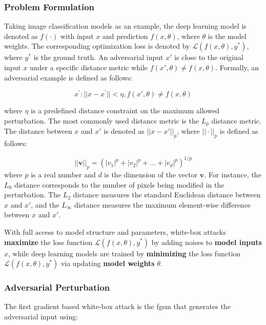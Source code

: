 \subsubsection{Problem Formulation}

Taking image classification models as an example, the deep learning model is denoted as $f(\cdot)$ with input $x$ and prediction $f(x, \theta)$, where $\theta$ is the model weights. The corresponding optimization loss is denoted by $\mathcal{L}(f(x, \theta), y^*)$, where $y^*$ is the ground truth. An adversarial input $x'$ is close to the original input $x$ under a specific distance metric while $f(x', \theta) \neq f(x, \theta)$. Formally, an adversarial example is defined as follows:

\begin{equation}
x^{'}: ||x - x^{'}|| < \eta, f(x', \theta) \neq f(x, \theta)
\end{equation}

where $ \eta $ is a predefined distance constraint on the maximum allowed perturbation. The most commonly used distance metric is the $L_p$ distance metric. The distance between $x$ and $x'$ is denoted as $||x-x'||_{p}$, where $||\cdot||_p$ is defined as follows:

\begin{equation}
 ||\textbf{v}||_p = (|v_1|^p + |v_2|^p + \dots + |v_d|^p)^{1/p}
\end{equation}
where $p$ is a real number and $d$ is the dimension of the vector $\textbf{v}$. For instance, the $L_0$ distance corresponds to the number of pixels being modified in the perturbation. The $L_2$ distance measures the standard Euclidean distance between $x$ and $x'$, and the $L_\infty$ distance measures the maximum element-wise difference between $x$ and $x'$.

With full access to model structure and parameters, white-box attacks \textbf{maximize} the loss function  $\mathcal{L}(f(x, \theta), y^*)$ by adding noises to \textbf{ model inputs} $x$, while deep learning models are trained by \textbf{minimizing} the loss function  $\mathcal{L}(f(x, \theta), y^*)$ via updating \textbf{model weights} $\theta$.

\subsubsection{Adversarial Perturbation}

The first gradient based white-box attack is the \acrfull{fgsm} \citep{goodfellow2015explaining} that generates the adversarial input using:

